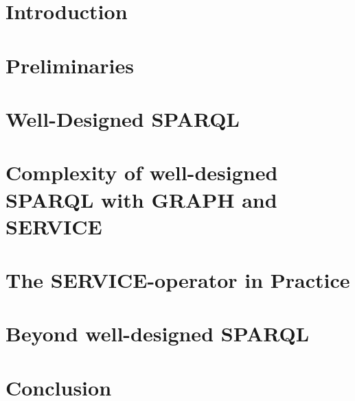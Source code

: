\documentclass[draft,final]{vutinfth} %
\begin{document}

\tableofcontents %

\mainmatter

\chapter{Introduction}


\chapter{Preliminaries}


\chapter{Well-Designed SPARQL}


\chapter{Complexity of well-designed SPARQL with GRAPH and SERVICE}


\chapter{The SERVICE-operator in Practice}\label{chapter:serviceeval}


\chapter{Beyond well-designed SPARQL}


\chapter{Conclusion}

\backmatter

\listoffigures %

\listoftables %

\listofalgorithms
{}

\printindex

\printglossaries



\end{document}
